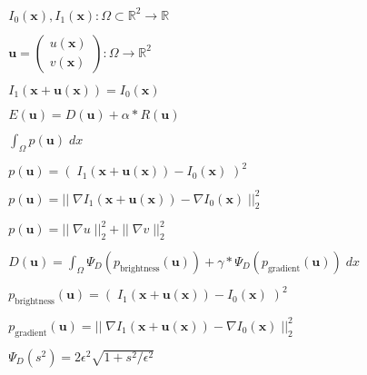 \documentclass[11pt]{article}
\newcommand{\mat}[1]{\begin{pmatrix} #1 \end{pmatrix}}
\newcommand{\Real}{\mathbb{R}}
\newcommand{\flow}{\boldsymbol{u}}
\newcommand{\x}{\boldsymbol{x}}
\begin{document}
\begin{align*}
& I_0(\x),I_1(\x) : \Omega \subset \Real^2 \rightarrow \Real
\\\\
& \flow = \mat{u(\x)\\v(\x)} : \Omega \rightarrow \Real^2
\\\\
&I_1(\x+\flow(\x))=I_0(\x)
\\\\
&E(\flow)=D(\flow)+\alpha*R(\flow)
\\\\
&\int_\Omega p(\flow)\;dx
\\\\
&p(\flow) = (\;I_1(\x+\flow(\x))-I_0(\x)\;)^2
\\\\
&p(\flow) = ||\;\nabla I_1(\x+\flow(\x))-\nabla I_0(\x)\;||_2^2
\\\\
&p(\flow)= ||\;\nabla u\;||_2^2 + ||\;\nabla v\;||_2^2
\\\\
&D(\flow) = \int_\Omega \Psi_D(p_{\text{brightness}}(\flow)) + \gamma*\Psi_D(p_{\text{gradient}}(\flow))\;dx
\\\\
&p_{\text{brightness}}(\flow) = (\;I_1(\x+\flow(\x))-I_0(\x)\;)^2
\\\\
&p_{\text{gradient}}(\flow) = ||\;\nabla I_1(\x+\flow(\x))-\nabla I_0(\x)\;||_2^2
\\\\
&\Psi_D(s^2) = 2\epsilon^2\sqrt{1+s^2/\epsilon^2}
\end{align*}
\end{document}
